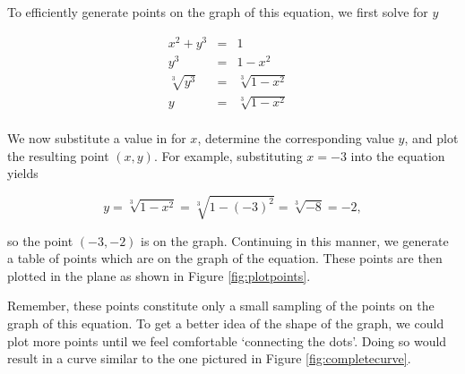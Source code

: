 {
To  efficiently generate points on the graph of this equation, we first solve for $y$

\[ \begin{array}{rclr} 
    x^2 + y^3 & = & 1 & \\ 
          y^3 & = & 1 - x^2 & \\
\sqrt[3]{y^3} & = & \sqrt[3]{1 - x^2} & \\
            y & = & \sqrt[3]{1 - x^2} & \\ 
            \end{array} \]

We now substitute a value in for $x$, determine the corresponding value $y$, and plot the resulting point $(x,y)$.  For example, substituting $x=-3$ into the equation yields

\[y = \sqrt[3]{1 - x^2} = \sqrt[3]{1 - (-3)^2} = \sqrt[3]{-8} = - 2,\]

so the point $(-3, -2)$ is on the graph.  Continuing in this manner, we generate a table of points which are on the graph of the equation.  These points are then plotted in the plane as shown in Figure \ref{fig:plotpoints}.


Remember, these points constitute only a small sampling of the points on the graph of this equation.  To get a better idea of the shape of the graph, we could plot more points until we feel comfortable `connecting the dots'.  Doing so would result in a curve similar to the one pictured in Figure \ref{fig:completecurve}.

}
